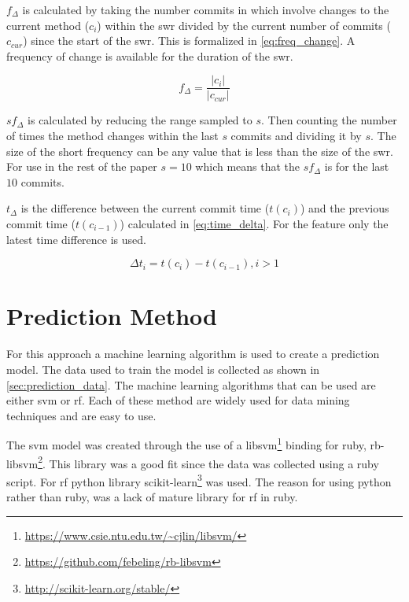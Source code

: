 $f_{\Delta}$ is calculated by taking the number commits in which involve changes to the current method ($c_i$) within the \gls{swr} divided by the current number of commits ($c_{cur}$) since the start of the \gls{swr}. This is formalized in \autoref{eq:freq_change}. A frequency of change is available for the duration of the \gls{swr}.

\begin{equation}
\label{eq:freq_change}
f_{\Delta} = \frac{|c_i|}{|c_{cur}|}
\end{equation}

$sf_{\Delta}$ is calculated by reducing the range sampled to $s$. Then counting the number of times the method changes within the last $s$ commits and dividing it by $s$. The size of the short frequency can be any value that is less than the size of the \gls{swr}. For use in the rest of the paper $s = 10$ which means that the $sf_{\Delta}$ is for the last $10$ commits.


$t_\Delta$ is the difference between the current commit time ($t(c_i)$) and the previous commit time ($t(c_{i-1})$) calculated in \autoref{eq:time_delta}. For the feature only the latest time difference is used.

\begin{equation}
\label{eq:time_delta}
\Delta t_{i} = t(c_i) - t(c_{i-1}), i > 1
\end{equation}

\section{Prediction Method}
\label{sec:prediction_method}


For this approach a machine learning algorithm is used to create a prediction model. The data used to train the model is collected as shown in \autoref{sec:prediction_data}. The machine learning algorithms that can be used are either \gls{svm} or \gls{rf}. Each of these method are widely used for data mining techniques and are easy to use. 

The \gls{svm} model was created through the use of a libsvm\footnote{\url{https://www.csie.ntu.edu.tw/~cjlin/libsvm/}} binding for ruby, rb-libsvm\footnote{\url{https://github.com/febeling/rb-libsvm}}. This library was a good fit since the data was collected using a ruby script. For \gls{rf} python library scikit-learn\footnote{\url{http://scikit-learn.org/stable/}} was used. The reason for using python rather than ruby, was a lack of mature library for \gls{rf} in ruby.

